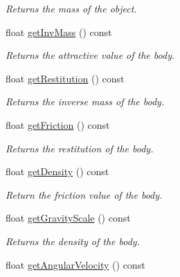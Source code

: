 \begin{DoxyCompactItemize}
\begin{DoxyCompactList}\small\item\em Returns the mass of the object. \end{DoxyCompactList}\item 
\hypertarget{class_body2_d_a186299396d4997908742dded5d038d08}{float \hyperlink{class_body2_d_a186299396d4997908742dded5d038d08}{get\+Inv\+Mass} () const }\label{class_body2_d_a186299396d4997908742dded5d038d08}

\begin{DoxyCompactList}\small\item\em Returns the attractive value of the body. \end{DoxyCompactList}\item 
\hypertarget{class_body2_d_acc065c0b756382f13e60007b3fb744cc}{float \hyperlink{class_body2_d_acc065c0b756382f13e60007b3fb744cc}{get\+Restitution} () const }\label{class_body2_d_acc065c0b756382f13e60007b3fb744cc}

\begin{DoxyCompactList}\small\item\em Returns the inverse mass of the body. \end{DoxyCompactList}\item 
\hypertarget{class_body2_d_a5a134ecd508bf33e21e29daf6bef9752}{float \hyperlink{class_body2_d_a5a134ecd508bf33e21e29daf6bef9752}{get\+Friction} () const }\label{class_body2_d_a5a134ecd508bf33e21e29daf6bef9752}

\begin{DoxyCompactList}\small\item\em Returns the restitution of the body. \end{DoxyCompactList}\item 
\hypertarget{class_body2_d_a26811630bb15275fd33548e20b5a65f2}{float \hyperlink{class_body2_d_a26811630bb15275fd33548e20b5a65f2}{get\+Density} () const }\label{class_body2_d_a26811630bb15275fd33548e20b5a65f2}

\begin{DoxyCompactList}\small\item\em Return the friction value of the body. \end{DoxyCompactList}\item 
\hypertarget{class_body2_d_a3ef473f845ad2d8cbbc38b8afbaa5737}{float \hyperlink{class_body2_d_a3ef473f845ad2d8cbbc38b8afbaa5737}{get\+Gravity\+Scale} () const }\label{class_body2_d_a3ef473f845ad2d8cbbc38b8afbaa5737}

\begin{DoxyCompactList}\small\item\em Returns the density of the body. \end{DoxyCompactList}\item 
\hypertarget{class_body2_d_ab9a9164631ae99f75a3934ecadc8a940}{float \hyperlink{class_body2_d_ab9a9164631ae99f75a3934ecadc8a940}{get\+Angular\+Velocity} () const }\label{class_body2_d_ab9a9164631ae99f75a3934ecadc8a940}


\end{DoxyCompactItemize}
